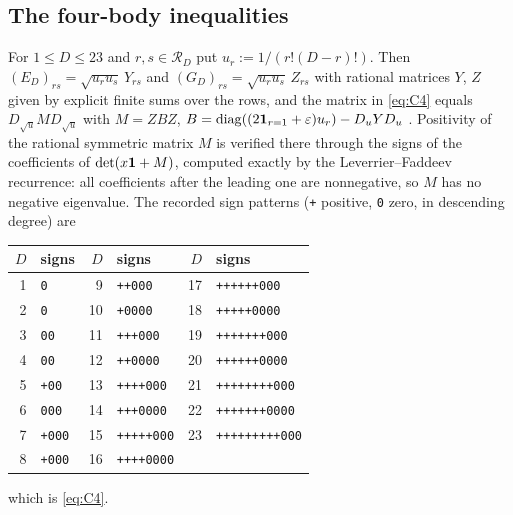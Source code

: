 \subsection{The four-body inequalities}

For $1\le D\le23$ and $r,s\in\mathcal R_D$ put $u_r:=1/(r!(D-r)!)$. Then $(E_D)_{rs}=\sqrt{u_ru_s}\,Y_{rs}$ and
$(G_D)_{rs}=\sqrt{u_ru_s}\,Z_{rs}$ with rational matrices $Y$, $Z$ given by explicit finite sums over the rows,
and the matrix in \eqref{eq:C4} equals $D_{\sqrt u}MD_{\sqrt u}$ with $M=ZBZ$, $B=\mathrm{diag}((2\mathbf{1}_{r=1}+\varepsilon)u_r)-D_uYD_u$
\cite[Appendix~A.3, (42)--(46)]{OAI:A-Fock-space-inequality-and-the-Laughlin-spectral-gap-September-24-2026}. Positivity of the rational symmetric
matrix $M$ is verified there through the signs of the coefficients of $\det(x\mathbf{1}+M)$, computed exactly by the Leverrier--Faddeev
recurrence: all coefficients after the leading one are nonnegative, so $M$ has no negative eigenvalue. The recorded sign patterns
(\texttt{+} positive, \texttt{0} zero, in descending degree) are
\begin{center}
\begin{tabular}{rl@{\qquad}rl@{\qquad}rl}
\toprule
$D$&signs&$D$&signs&$D$&signs\\
\midrule
1&\texttt{0}&9&\texttt{++000}&17&\texttt{++++++000}\\
2&\texttt{0}&10&\texttt{+0000}&18&\texttt{+++++0000}\\
3&\texttt{00}&11&\texttt{+++000}&19&\texttt{+++++++000}\\
4&\texttt{00}&12&\texttt{++0000}&20&\texttt{++++++0000}\\
5&\texttt{+00}&13&\texttt{++++000}&21&\texttt{++++++++000}\\
6&\texttt{000}&14&\texttt{+++0000}&22&\texttt{+++++++0000}\\
7&\texttt{+000}&15&\texttt{+++++000}&23&\texttt{+++++++++000}\\
8&\texttt{+000}&16&\texttt{++++0000}&&\\
\bottomrule
\end{tabular}
\end{center}
which is \eqref{eq:C4}.
